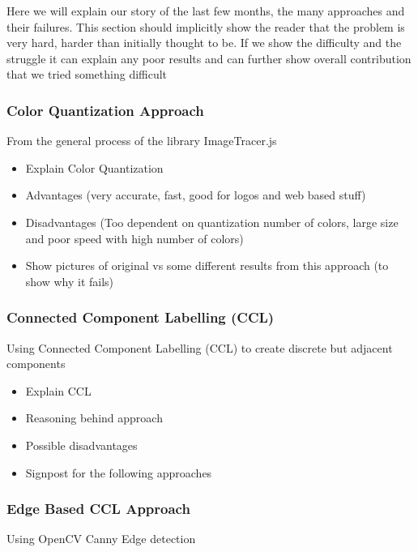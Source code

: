 \documentclass[12pt]{article}
\begin{document}
    Here we will explain our story of the last few months, the many approaches and their failures. This section
    should implicitly show the reader that the problem is very hard, harder than initially thought to be. If
    we show the difficulty and the struggle it can explain any poor results and can further show overall contribution
    that we tried something difficult

    \subsubsection{Color Quantization Approach}

    From the general process of the library ImageTracer.js

    \begin{itemize}
        \item Explain Color Quantization
        \item Advantages (very accurate, fast, good for logos and web based stuff)
        \item Disadvantages (Too dependent on quantization number of colors, large size and poor speed with high number of colors)
        \item Show pictures of original vs some different results from this approach (to show why it fails)
    \end{itemize}

    \subsubsection{Connected Component Labelling (CCL)}

    Using Connected Component Labelling (CCL) to create discrete but adjacent components

    \begin{itemize}
        \item Explain CCL
        \item Reasoning behind approach
        \item Possible disadvantages
        \item Signpost for the following approaches
    \end{itemize}

    \subsubsection{Edge Based CCL Approach}

    Using OpenCV Canny Edge detection
\end{document}
